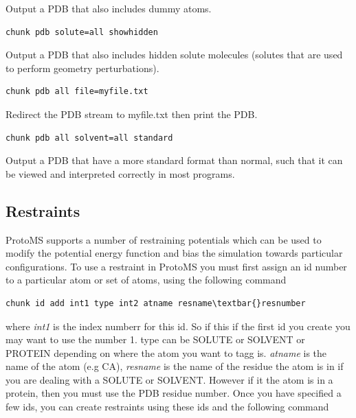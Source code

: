 \documentclass[letterpaper,10pt,english]{sphinxmanual}
\begin{document}
Output a PDB that also includes dummy atoms.

\begin{Verbatim}[commandchars=\\\{\}]
chunk pdb solute=all showhidden
\end{Verbatim}

Output a PDB that also includes hidden solute molecules (solutes that are used to perform geometry perturbations).

\begin{Verbatim}[commandchars=\\\{\}]
chunk pdb all file=myfile.txt
\end{Verbatim}

Redirect the PDB stream to myfile.txt then print the PDB.

\begin{Verbatim}[commandchars=\\\{\}]
chunk pdb all solvent=all standard
\end{Verbatim}

Output a PDB that have a more standard format than normal, such that it can be viewed and interpreted correctly in most programs.


\subsection{Restraints}
\label{protoms:index-75}\label{protoms:restraints}
ProtoMS supports a number of restraining potentials which can be used to modify the potential energy function and bias the simulation towards particular configurations. To use a restraint in ProtoMS you must first assign an id number to a particular atom or set of atoms, using the following command

\begin{Verbatim}[commandchars=\\\{\}]
chunk id add int1 type int2 atname resname\textbar{}resnumber
\end{Verbatim}

where \emph{int1} is the index numberr for this id. So if this if the first id you create you may want to use the number 1. type can be SOLUTE or SOLVENT or PROTEIN depending on where the atom you want to tagg is. \emph{atname} is the name of the atom (e.g CA), \emph{resname} is the name of the residue the atom is in if you are dealing with a SOLUTE or SOLVENT. However if it the atom is in a protein, then you must use the PDB residue number.
Once you have specified a few ids, you can create restraints using these ids and the following command
\end{document}
